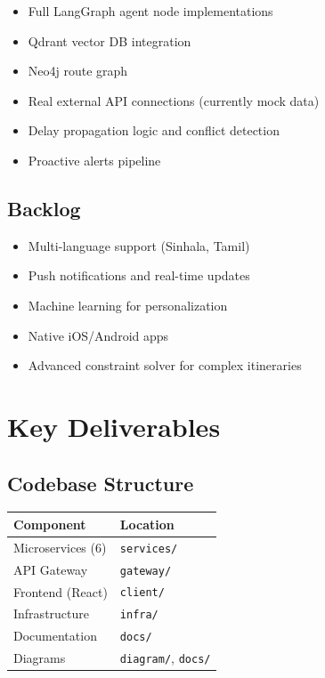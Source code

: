 \documentclass[11pt]{article}
\begin{document}
\begin{itemize}
    \item Full LangGraph agent node implementations
    \item Qdrant vector DB integration
    \item Neo4j route graph
    \item Real external API connections (currently mock data)
    \item Delay propagation logic and conflict detection
    \item Proactive alerts pipeline
\end{itemize}

\subsection{Backlog}

\begin{itemize}
    \item Multi-language support (Sinhala, Tamil)
    \item Push notifications and real-time updates
    \item Machine learning for personalization
    \item Native iOS/Android apps
    \item Advanced constraint solver for complex itineraries
\end{itemize}

\section{Key Deliverables}

\subsection{Codebase Structure}

\begin{table}[H]\centering\small
\begin{tabular}{|l|l|}
\hline
\textbf{Component} & \textbf{Location} \\
\hline
Microservices (6) & \texttt{services/} \\
API Gateway & \texttt{gateway/} \\
Frontend (React) & \texttt{client/} \\
Infrastructure & \texttt{infra/} \\
Documentation & \texttt{docs/} \\
Diagrams & \texttt{diagram/}, \texttt{docs/} \\
\hline
\end{tabular}
\end{table}
\end{document}
